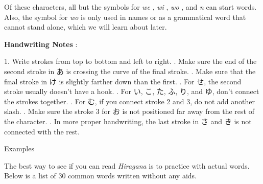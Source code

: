 \par{ Of these characters, all but the symbols for \emph{we }, \emph{wi }, \emph{wo }, and \emph{n }can start words. Also, the symbol for \emph{wo }is only used in names or as a grammatical word that cannot stand alone, which we will learn about later. }

\par{\textbf{Handwriting Notes }: }

\par{1. Write strokes from top to bottom and left to right. \hfill{}. Make sure the end of the second stroke in あ is crossing the curve of the final stroke. \hfill{}. Make sure that the final stroke in け is slightly farther down than the first. \hfill{}. For せ, the second stroke usually doesn't have a hook. \hfill{}. For い, こ, た, ふ, り, and ゆ, don't connect the strokes together. \hfill{}. For む, if you connect stroke 2 and 3, do not add another slash. \hfill{}. Make sure the stroke 3 for お is not positioned far away from the rest of the character. \hfill{}.  In more proper handwriting, the last stroke in さ and き is not connected  with the rest. }

\begin{center}
Examples 
\end{center}

\par{ The best way to see if you can read \emph{Hiragana }is to practice with actual words. Below is a list of 30 common words written without any aids. }

